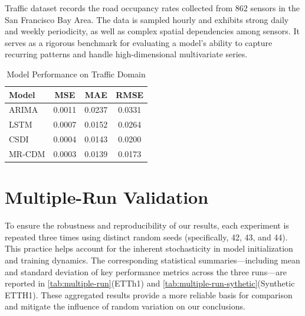 Traffic dataset records the road occupancy rates collected from 862 sensors in the San Francisco Bay Area. The data is sampled hourly and exhibits strong daily and weekly periodicity, as well as complex spatial dependencies among sensors. It serves as a rigorous benchmark for evaluating a model's ability to capture recurring patterns and handle high-dimensional multivariate series.
\begin{table}[H]
\centering
\caption{Model Performance on Traffic Domain}
\label{tab:traffic}
\begin{tabular}{lccc}
\hline
Model & MSE & MAE & RMSE \\ \hline
ARIMA & {0.0011} & {0.0237} & {0.0331} \\
LSTM & {0.0007} & {0.0152} & {0.0264}\\
CSDI & {0.0004} & {0.0143} & {0.0200}\\
MR-CDM & {0.0003} & {0.0139} & {0.0173} \\
\hline
\end{tabular}
\end{table}

\section{Multiple-Run Validation}
\label{sec:multiple}
To ensure the robustness and reproducibility of our results, each experiment is repeated three times using distinct random seeds (specifically, 42, 43, and 44). This practice helps account for the inherent stochasticity in model initialization and training dynamics. The corresponding statistical summaries—including mean and standard deviation of key performance metrics across the three runs—are reported in \autoref{tab:multiple-run}(ETTh1) and \autoref{tab:multiple-run-sythetic}(Synthetic ETTH1). These aggregated results provide a more reliable basis for comparison and mitigate the influence of random variation on our conclusions.

